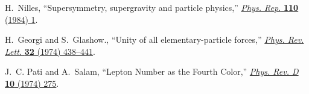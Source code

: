 H.~Nilles, ``{Supersymmetry, supergravity and particle physics},''
  \href{http://dx.doi.org/10.1016/0370-1573(84)90008-5}{{\em Phys. Rep.}
  {\bfseries 110} (1984) 1}.

H.~Georgi and S.~Glashow., ``{Unity of all elementary-particle forces},''
\href{https://doi.org/10.1103/PhysRevLett.32.438}{{\em Phys. Rev. Lett.}
  {\bfseries 32} (1974) 438--441}.

J.~C. Pati and A.~Salam, ``{Lepton Number as the Fourth Color},''
  \href{http://dx.doi.org/10.1103/PhysRevD.10.275}{{\em Phys. Rev. D}
  {\bfseries 10} (1974) 275}.




